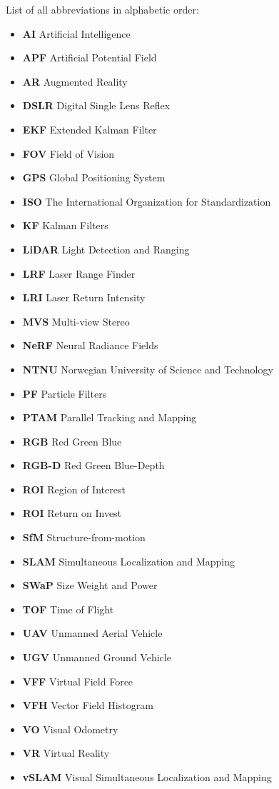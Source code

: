 
List of all abbreviations in alphabetic order:

\begin{itemize}
    \item \textbf{AI} Artificial Intelligence
    \item \textbf{APF} Artificial Potential Field
    \item \textbf{AR} Augmented Reality
    \item \textbf{DSLR} Digital Single Lens Reflex
    \item \textbf{EKF} Extended Kalman Filter
    \item \textbf{FOV} Field of Vision
    \item \textbf{GPS} Global Positioning System
    \item \textbf{ISO} The International Organization for Standardization
    \item \textbf{KF} Kalman Filters
    \item \textbf{LiDAR} Light Detection and Ranging
    \item \textbf{LRF} Laser Range Finder
    \item \textbf{LRI} Laser Return Intensity
    \item \textbf{MVS} Multi-view Stereo
    \item \textbf{NeRF} Neural Radiance Fields
    \item \textbf{NTNU} Norwegian University of Science and Technology
    \item \textbf{PF} Particle Filters
    \item \textbf{PTAM} Parallel Tracking and Mapping
    \item \textbf{RGB} Red Green Blue
    \item \textbf{RGB-D} Red Green Blue-Depth
    \item \textbf{ROI} Region of Interest
    \item \textbf{ROI} Return on Invest
    \item \textbf{SfM} Structure-from-motion
    \item \textbf{SLAM} Simultaneous Localization and Mapping
    \item \textbf{SWaP} Size Weight and Power
    \item \textbf{TOF} Time of Flight
    \item \textbf{UAV} Unmanned Aerial Vehicle
    \item \textbf{UGV} Unmanned Ground Vehicle
    \item \textbf{VFF} Virtual Field Force
    \item \textbf{VFH} Vector Field Histogram
    \item \textbf{VO} Visual Odometry
    \item \textbf{VR} Virtual Reality
    \item \textbf{vSLAM} Visual Simultaneous Localization and Mapping

    \end{itemize}